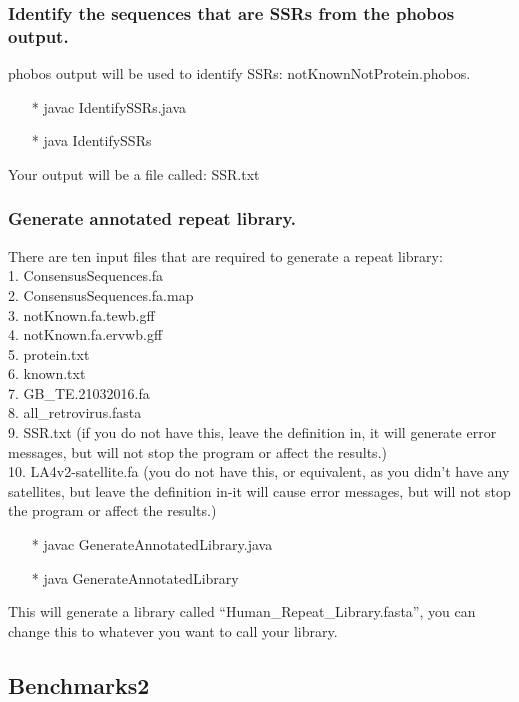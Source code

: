 \documentclass[12pt]{report}
\begin{document}
\subsubsection*{Identify the sequences that are SSRs from the phobos output.}
phobos output will be used to identify SSRs: notKnownNotProtein.phobos.
\begin{enumerate}
	\item[*] javac IdentifySSRs.java
	\item[*] java IdentifySSRs
\end{enumerate}
Your output will be a file called: SSR.txt

\subsubsection*{Generate annotated repeat library.}
There are ten input files that are required to generate a repeat library: \\
1. ConsensusSequences.fa \\
2. ConsensusSequences.fa.map \\
3. notKnown.fa.tewb.gff \\
4. notKnown.fa.ervwb.gff \\
5. protein.txt \\
6. known.txt \\
7. GB\_TE.21032016.fa \\
8. all\_retrovirus.fasta \\
9. SSR.txt (if you do not have this, leave the definition in, it will generate error messages, but will not stop the program or affect the results.) \\
10. LA4v2-satellite.fa (you do not have this, or equivalent, as you didn't have any satellites, but leave the definition in-it will cause error messages, but will not stop the program or affect the results.)
\begin{enumerate}
	\item[*] javac GenerateAnnotatedLibrary.java
	\item[*] java GenerateAnnotatedLibrary
\end{enumerate}
This will generate a library called \textquotedblleft*Human\_Repeat\_Library.fasta\textquotedblright, you can change this to whatever you want to call your library.

\subsection*{Benchmarks2}
\end{document}
